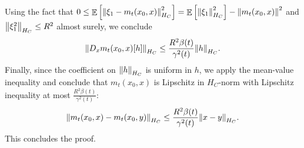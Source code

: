 Using the fact that \(0 \leq \mathop{\mathbb{E}}\qty[\norm{\xi_{1} - m_{t}(x_{0}, x)}_{H_{C}}^{2}] = \mathop{\mathbb{E}}\qty[\norm{\xi_{1}}_{H_{C}}^{2}] - \norm{m_{t}(x_{0}, x)}^{2}\) and \(\norm{\xi_{1}^{2}}_{H_{C}} \leq R^{2}\) almost surely, we conclude
\[
  \norm{D_{x} m_{t}(x_{0}, x)[h]}_{H_{C}} \leq \frac{R^{2} \beta(t)}{\gamma^{2}(t)} \norm{h}_{H_{C}}.
\]
Finally, since the coefficient on \(\norm{h}_{H_{C}}\) is uniform in \(h\), we apply the mean-value inequality and conclude that \(m_{t}(x_{0}, x)\) is Lipschitz in \(H_{C}\)-norm with Lipschitz inequality at most \(\frac{R^{2}\beta(t)}{\gamma^{2}(t)}\):
\[
  \norm{m_{t}(x_{0}, x) - m_{t}(x_{0}, y)}_{H_{C}} \leq \frac{R^{2}\beta(t)}{\gamma^{2}(t)} \norm{x - y}_{H_{C}}.
\]
This concludes the proof.